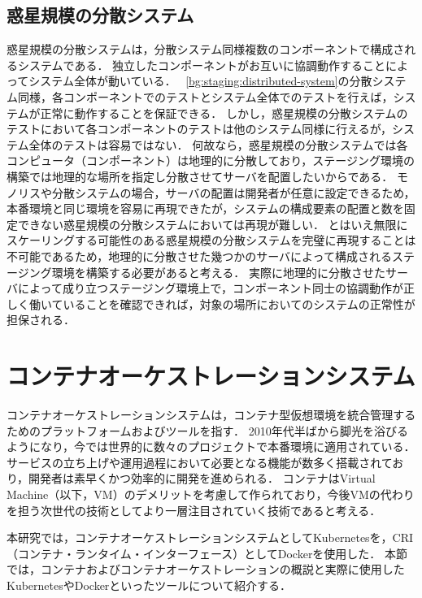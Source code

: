 \subsection{惑星規模の分散システム}
\label{bg:staging:planetary-scale-distributed-system}

惑星規模の分散システムは，分散システム同様複数のコンポーネントで構成されるシステムである．
独立したコンポーネントがお互いに協調動作することによってシステム全体が動いている．
~\ref{bg:staging:distributed-system}の分散システム同様，各コンポーネントでのテストとシステム全体でのテストを行えば，システムが正常に動作することを保証できる．
しかし，惑星規模の分散システムのテストにおいて各コンポーネントのテストは他のシステム同様に行えるが，システム全体のテストは容易ではない．
何故なら，惑星規模の分散システムでは各コンピュータ（コンポーネント）は地理的に分散しており，ステージング環境の構築では地理的な場所を指定し分散させてサーバを配置したいからである．
モノリスや分散システムの場合，サーバの配置は開発者が任意に設定できるため，本番環境と同じ環境を容易に再現できたが，システムの構成要素の配置と数を固定できない惑星規模の分散システムにおいては再現が難しい．
とはいえ無限にスケーリングする可能性のある惑星規模の分散システムを完璧に再現することは不可能であるため，地理的に分散させた幾つかのサーバによって構成されるステージング環境を構築する必要があると考える．
実際に地理的に分散させたサーバによって成り立つステージング環境上で，コンポーネント同士の協調動作が正しく働いていることを確認できれば，対象の場所においてのシステムの正常性が担保される．

\section{コンテナオーケストレーションシステム}
\label{background:container-orchestration-system}

コンテナオーケストレーションシステムは，コンテナ型仮想環境を統合管理するためのプラットフォームおよびツールを指す．
2010年代半ばから脚光を浴びるようになり，今では世界的に数々のプロジェクトで本番環境に適用されている．
サービスの立ち上げや運用過程において必要となる機能が数多く搭載されており，開発者は素早くかつ効率的に開発を進められる．
コンテナはVirtual Machine（以下，VM）のデメリットを考慮して作られており，今後VMの代わりを担う次世代の技術としてより一層注目されていく技術であると考える．

本研究では，コンテナオーケストレーションシステムとしてKubernetesを，CRI（コンテナ・ランタイム・インターフェース）としてDockerを使用した．
本節では，コンテナおよびコンテナオーケストレーションの概説と実際に使用したKubernetesやDockerといったツールについて紹介する．

